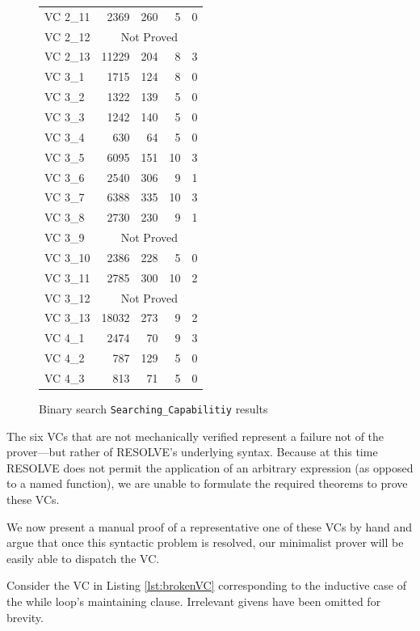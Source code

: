 \begin{figure}[t]
\begin{tabular}{lrrrr}
		VC 2\_11 & 2369		& 260	& 5 	& 0     \\
		VC 2\_12 & \multicolumn{4}{c}{Not Proved}       \\
		VC 2\_13 & 11229	& 204	& 8	& 3     \\
		VC 3\_1	& 1715		& 124	& 8 	& 0     \\
		VC 3\_2	& 1322		& 139	& 5	& 0     \\
		VC 3\_3	& 1242		& 140	& 5 	& 0     \\
		VC 3\_4	& 630		& 64	& 5 	& 0     \\
		VC 3\_5	& 6095		& 151	& 10	& 3     \\
		VC 3\_6	& 2540		& 306	& 9	& 1     \\
		VC 3\_7	& 6388 		& 335	& 10	& 3     \\
		VC 3\_8	& 2730 		& 230	& 9	& 1     \\
		VC 3\_9	& \multicolumn{4}{c}{Not Proved}        \\
		VC 3\_10 & 2386		& 228	& 5 	& 0     \\
		VC 3\_11 & 2785		& 300	& 10	& 2     \\
		VC 3\_12 & \multicolumn{4}{c}{Not Proved}       \\
		VC 3\_13 & 18032	& 273	& 9	& 2     \\
		VC 4\_1	& 2474		& 70	& 9 	& 3     \\
		VC 4\_2	& 787		& 129	& 5	& 0     \\
		VC 4\_3	& 813		& 71	& 5 	& 0     \\
		\bottomrule
	\end{tabular}
	\caption{Binary search \texttt{Searching\_Capabilitiy} results\label{fig:binSearchResults}}
\end{figure}

The six VCs that are not mechanically verified represent a failure not of the prover---but rather of RESOLVE's underlying syntax.  Because at this time RESOLVE does not permit the application of an arbitrary expression (as opposed to a named function), we are unable to formulate the required theorems to prove these VCs.

We now present a manual proof of a representative one of these VCs by hand and argue that once this syntactic problem is resolved, our minimalist prover will be easily able to dispatch the VC.

Consider the VC in Listing \ref{lst:brokenVC} corresponding to the inductive case of the while loop's maintaining clause.  Irrelevant givens have been omitted for brevity.

